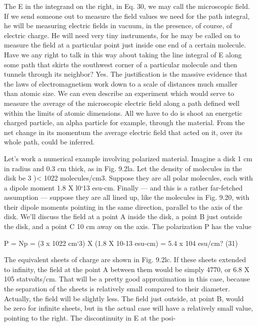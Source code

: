 {The E in the integrand on the right, in Eq. 30, we may call the
microscopic field. If we send someone out to measure the field values
we need for the path integral, he will be measuring electric fields in
vacuum, in the presence, of course, of electric charge. He will need
very tiny instruments, for he may be called on to measure the field
at a particular point just inside one end of a certain molecule. Have
we any right to talk in this way about taking the line integral of E
along some path that skirts the southwest corner of a particular
molecule and then tunnels through its neighbor? Yes. The justification
is the massive evidence that the laws of electromagnetism work
down to a scale of distances much smaller than atomic size. We can
even describe an experiment which would serve to measure the
average of the microscopic electric field along a path defined well
within the limits of atomic dimensions. All we have to do is shoot
an energetic charged particle, an alpha particle for example, through
the material. From the net change in its momentum the average
electric field that acted on it, over its whole path, could be inferred.

Let's work a numerical example involving polarized material.
Imagine a disk 1 cm in radius and 0.3 cm thick, as in Fig. 9.2la. Let
the density of molecules in the disk be 3 )< 1022 molecules/cm3.
Suppose they are all polar molecules, each with a dipole moment
1.8 X l0‘13 esu-cm. Finally --- and this is a rather far-fetched
assumption --- suppose they are all lined up, like the molecules in
Fig. 9.20, with their dipole moments pointing in the same direction,
parallel to the axis of the disk. We'll discuss the field at a point A
inside the disk, a point B just outside the disk, and a point C 10 cm
away on the axis. The polarization P has the value

\begin{equation}
\end{equation}
P = Np = (3 x 1022 cm‘3) X (1.8 X 10-13 esu-cm)
= 5.4 x 104 esu/cm? (31)

The equivalent sheets of charge are shown in Fig. 9.2lc. If these
sheets extended to infinity, the field at the point A between them
would be simply 4770, or 6.8 X 105 statvolts/cm. That will be a
pretty good approximation in this case, because the separation of
the sheets is relatively small compared to their diameter. Actually,
the field will be slightly less. The field just outside, at point B, would
be zero for infinite sheets, but in the actual case will have a relatively
small value, pointing to the right. The discontinuity in E at the posi-

}
